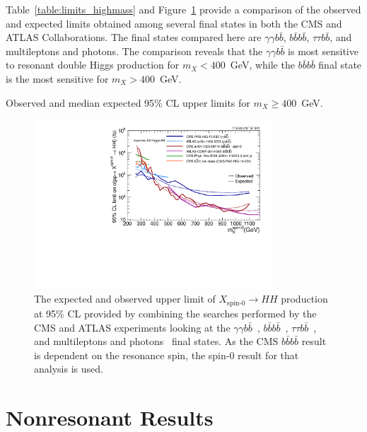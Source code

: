 Table~\ref{table:limits_highmass} and Figure~\ref{fig:limit_comp}
provide a comparison of the observed and expected limits obtained
among several final states in both the CMS and ATLAS Collaborations. The final states compared here
are $\gamma \gamma b\bar{b}$, $b\bar{b}b\bar{b}$, $\tau\tau b\bar{b}$, and multileptons and photons.
The comparison reveals that the $\gamma \gamma b\bar{b}$ is most sensitive to resonant double
Higgs production for $m_X < 400$~GeV, while the $b\bar{b}b\bar{b}$ final state is the most sensitive
for $m_X > 400$~GeV.

\begin{table}[ht]
  \centering
  \renewcommand{\arraystretch}{1.4}
  \caption{Observed and median expected 95\% CL upper limits for $m_X \ge 400$~GeV.}
  
  \label{table:limits_highmass}
\end{table}

\begin{figure}[ht]
 \begin{center}
   \includegraphics[width=0.8\textwidth]{figures/results/limit_comparison_all.pdf}
 \end{center}
\caption{The expected and observed upper limit of $X_\text{spin-0} \rightarrow HH$ production
at 95\% CL provided by combining the searches performed by the CMS and ATLAS experiments
looking at the $\gamma \gamma b\bar{b}$~\cite{CMS-PAS-HIG-13-032,Aad:2014yja},
$b\bar{b}b\bar{b}$~\cite{Khachatryan:2015yea,ATLAS-CONF-2014-005},
$\tau\tau b\bar{b}$~\cite{CMS-PAS-HIG-14-034}, and
multileptons and photons~\cite{PhysRevD.90.112013}
final states. As the CMS $b\bar{b}b\bar{b}$ result is dependent on the
resonance spin, the spin-0 result for that analysis is used.}
\label{fig:limit_comp}
\end{figure}


\section{Nonresonant Results\label{sec:nonresresults}}

